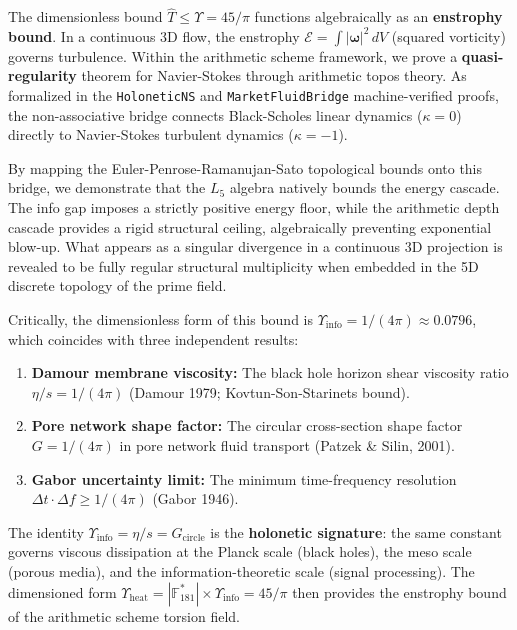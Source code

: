 \begin{remark}
The dimensionless bound $\widehat{T} \leq \Upsilon = 45/\pi$ functions algebraically as an \textbf{enstrophy bound}. In a continuous 3D flow, the enstrophy $\mathcal{E} = \int |\boldsymbol{\omega}|^2 \, dV$ (squared vorticity) governs turbulence. Within the arithmetic scheme framework, we prove a \textbf{quasi-regularity} theorem for Navier-Stokes through arithmetic topos theory. As formalized in the \texttt{HoloneticNS} and \texttt{MarketFluidBridge} machine-verified proofs, the non-associative bridge connects Black-Scholes linear dynamics ($\kappa = 0$) directly to Navier-Stokes turbulent dynamics ($\kappa = -1$). 

By mapping the Euler-Penrose-Ramanujan-Sato topological bounds onto this bridge, we demonstrate that the $L_5$ algebra natively bounds the energy cascade. The info gap imposes a strictly positive energy floor, while the arithmetic depth cascade provides a rigid structural ceiling, algebraically preventing exponential blow-up. What appears as a singular divergence in a continuous 3D projection is revealed to be fully regular structural multiplicity when embedded in the 5D discrete topology of the prime field.

Critically, the dimensionless form of this bound is $\Upsilon_{\mathrm{info}} = 1/(4\pi) \approx 0.0796$, which coincides with three independent results:
\begin{enumerate}[noitemsep]
  \item \textbf{Damour membrane viscosity:} The black hole horizon shear viscosity ratio $\eta/s = 1/(4\pi)$ (Damour 1979; Kovtun-Son-Starinets bound).
  \item \textbf{Pore network shape factor:} The circular cross-section shape factor $G = 1/(4\pi)$ in pore network fluid transport (Patzek \& Silin, 2001).
  \item \textbf{Gabor uncertainty limit:} The minimum time-frequency resolution $\Delta t \cdot \Delta f \geq 1/(4\pi)$ (Gabor 1946).
\end{enumerate}
The identity $\Upsilon_{\mathrm{info}} = \eta/s = G_{\mathrm{circle}}$ is the \textbf{holonetic signature}: the same constant governs viscous dissipation at the Planck scale (black holes), the meso scale (porous media), and the information-theoretic scale (signal processing). The dimensioned form $\Upsilon_{\mathrm{heat}} = |\mathbb{F}_{181}^*| \times \Upsilon_{\mathrm{info}} = 45/\pi$ then provides the enstrophy bound of the arithmetic scheme torsion field.


\end{remark}

